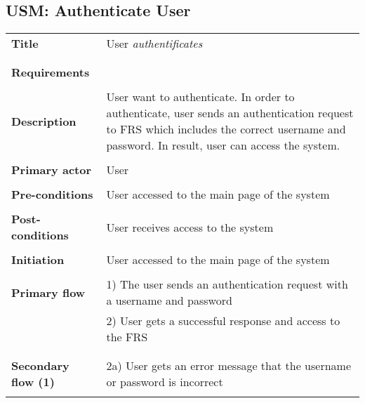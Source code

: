 \documentclass[a4paper,11pt]{article}
\begin{document}
\subsection{USM: Authenticate User}
 
\begin{tabular}{|p{4cm}|p{10cm}|} \hline 
  \textbf{Title} &   User \emph{authentificates}  
   
  \\  
  \\ \hline \rowcolor{Gray} & \\ \hline 
  \textbf{Requirements} &     
  \\ \hline \rowcolor{Gray} & \\ \hline 
  \textbf{Description} &  User want to authenticate. In order to authenticate, user sends an authentication request to FRS which includes the correct username and password. In result, user can access the system. 
   
  \\ \hline \rowcolor{Gray} & \\ \hline 
   
  \textbf{Primary actor} & User   
   
  \\ \hline \rowcolor{Gray} & \\ \hline  
   
  \textbf{Pre-conditions} &   User accessed to the main page of the system 
   
  \\ \hline \rowcolor{Gray} & \\ \hline 
   
  \textbf{Post-conditions} &   User receives access to the system 
   
  \\ \hline \rowcolor{Gray} & \\ \hline  
   
  \textbf{Initiation} & User accessed to the main page of the system 
   
  \\ \hline \rowcolor{Gray} & \\ \hline  
   
  \textbf{Primary flow} &  
  1) The user sends an authentication request with a username and password  \\& 
  2) User gets a successful response and access to the FRS \\& 
   
  \\ \hline \rowcolor{Gray} & \\ \hline  
   
  \textbf{Secondary flow (1)} &  
  2a) User gets an error message that the username or password is incorrect \\&  
   
   
  \\ \hline   
\end{tabular} 
 
\end{document}
